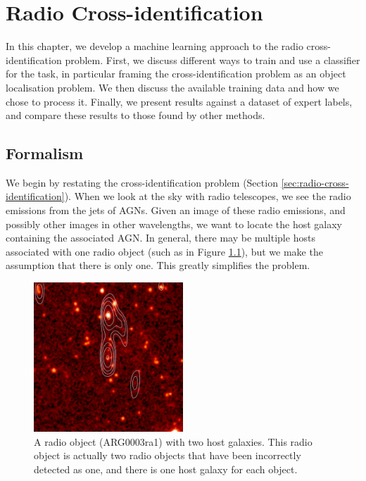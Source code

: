 
\chapter{Radio Cross-identification}
\label{cha:cross-identification}

  In this chapter, we develop a machine learning approach to the radio cross-
  identification problem. First, we discuss different ways to train and use
  a classifier for the task, in particular framing the cross-identification
  problem as an object localisation problem. We then discuss the available
  training data and how we chose to process it. Finally, we present results
  against a dataset of expert labels, and compare these results to those found
  by other methods.

\section{Formalism}
\label{sec:cross-identification-formalism}

  We begin by restating the cross-identification problem (Section
  \ref{sec:radio-cross-identification}). When we look at the sky with radio
  telescopes, we see the radio emissions from the jets of AGNs. Given an image
  of these radio emissions, and possibly other images in other wavelengths, we
  want to locate the host galaxy containing the associated AGN. In general,
  there may be multiple hosts associated with one radio object (such as in
  Figure \ref{fig:two-hosts}), but we make the assumption that there is only
  one. This greatly simplifies the problem.

  \begin{figure}[!ht]
    \centering
    \includegraphics[width=0.5\textwidth]{images/CI0370C1_heatmap+contours.png}
    \caption{A radio object (ARG0003ra1) with two host galaxies. This radio
      object is actually two radio objects that have been incorrectly detected
      as one, and there is one host galaxy for each object.}
    \label{fig:two-hosts}
  \end{figure}

